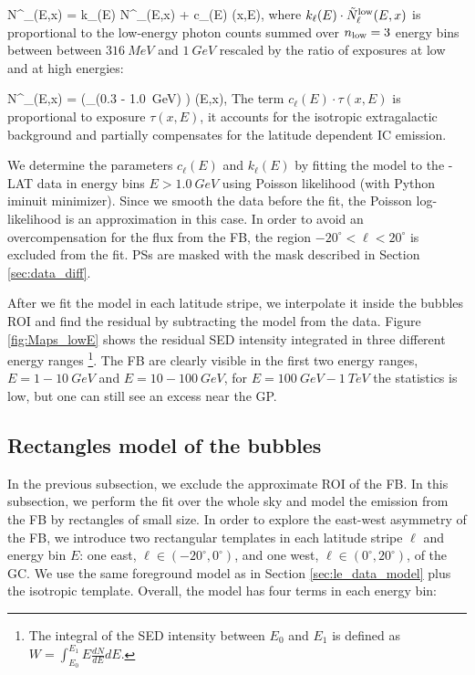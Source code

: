 \be
N^\model_{\ell}(E,x) = k_{\ell}(E) \cdot \tilde N^\low_{\ell}(E,x) + c_\ell(E) \cdot \tau(x,E),
\ee
where $k_{\ell}(E) \cdot \tilde N^{\text{low}}_\ell(E, x)$ is proportional to the low-energy photon counts summed over 
$n_{\text{low}} = 3$ energy bins between between $\SI{316}{MeV}$ and $\SI{1}{GeV}$ 
rescaled by the ratio of exposures at low and at high energies:

\be
\tilde N^\low_\ell(E,x) =  \left(\sum_{\epsilon \in (0.3 - \SI{1.0}{GeV})} \right) \cdot \tau(E,x),
\ee
The term $c_\ell(E) \cdot \tau(x,E)$ is proportional to exposure $\tau(x,E)$, it accounts for the isotropic extragalactic background and partially compensates for the latitude dependent IC emission. 

We determine the parameters $c_{\ell}(E)$ and $k_{\ell}(E)$ by fitting the model to the \Fermi-LAT data in energy bins $E > \SI{1.0}{GeV}$
using Poisson likelihood (with Python iminuit minimizer). Since we smooth the data before the fit, the Poisson log-likelihood is an approximation in this case. 
In order to avoid an overcompensation 
for the flux from the FB, the region $-20^\circ < \ell < 20^\circ$ is excluded from the fit. PSs are masked with the mask described in Section \ref{sec:data_diff}.


After we fit the model in each latitude stripe, we interpolate it inside the bubbles ROI and 
find the residual by subtracting the model from the data.
Figure \ref{fig:Maps_lowE} shows the residual SED intensity integrated in three different energy ranges%
\footnote{The integral of the SED intensity between $E_0$ and $E_1$ is defined as
$W = \int_{E_0}^{E_1} E \frac{dN}{dE} dE.$}.
The FB are clearly visible in the first two energy ranges, $E = 1 - \SI{10}{GeV}$ and $E = 10 - \SI{100}{GeV}$, for 
$E = \SI{100}{GeV} - \SI{1}{TeV}$ the statistics is low, but one can still see an excess near the GP.

\subsection{Rectangles model of the bubbles}
\label{sec:box_model}

In the previous subsection, we exclude the approximate ROI of the FB.
In this subsection, we perform the fit over the whole sky and model the emission from the FB by rectangles of small size.
In order to explore the east-west asymmetry of the FB, 
we introduce two rectangular templates in each latitude stripe $\ell$ and energy bin $E$: 
one east, $\ell \in (-20^\circ, 0^\circ)$, and one west, $\ell \in (0^\circ, 20^\circ)$, of the GC.
We use the same foreground model as in Section \ref{sec:le_data_model} plus the isotropic template.
Overall, the model has four terms in each energy bin:

